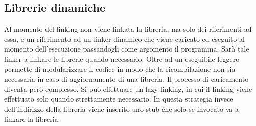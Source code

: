 \subsection{Librerie dinamiche}
Al momento del linking non viene linkata la libreria, ma solo dei riferimenti ad essa, e un riferimento ad un linker dinamico che viene caricato ed eseguito al momento
dell'esecuzione passandogli come argomento il programma. Sar\`a tale linker a linkare le librerie quando necessario. Oltre ad un eseguibile leggero permette di 
modularizzare il codice in modo che la ricompilazione non sia necessaria in caso di aggiornamento di una libreria. Il processo di caricamento diventa per\`o complesso.
Si pu\`o effettuare un lazy linking, in cui il linking viene effettuato solo quando strettamente necessario. In questa strategia invece dell'indirizzo della libreria
viene inserito uno stub che solo se invocato va a linkare la libreria. 
